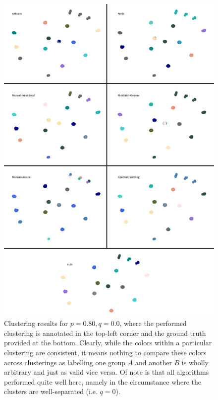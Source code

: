 \documentclass{article}
\begin{document}
\begin{figure}[H]
    \centering
    \includegraphics[width=.85\textwidth]{results/results_p-80_q-00.png}
    \caption[Clustering for $p=0.80,q=0.0$]{Clustering results for $p=0.80,q=0.0$, where the performed clustering is annotated in the top-left corner and the ground truth provided at the bottom. Clearly, while the colors within a particular clustering are consistent, it means nothing to compare these colors across clusterings as labelling one group $A$ and another $B$ is wholly arbitrary and just as valid vice versa. Of note is that all algorithms performed quite well here, namely in the circumstance where the clusters are well-separated (i.e. $q=0$).}
    \label{fig:results_p-80_q-00}
\end{figure}
\end{document}
